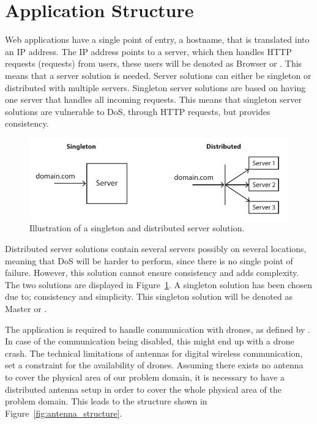 \section{Application Structure}
\label{sec:application_structure}

Web applications have a single point of entry, a hostname, that is translated into an IP address.
The IP address points to a server, which then handles HTTP requests (requests) from users, these users will be denoted as Browser or .
This means that a server solution is needed.
Server solutions can either be singleton or distributed with multiple servers.
Singleton server solutions are based on having one server that handles all incoming requests.
This means that singleton server solutions are vulnerable to DoS, through HTTP requests, but provides consistency.

\begin{figure}[htb]
    \centering
    \includegraphics[width=\textwidth]{gfx/server_solutions.pdf}
    \caption{Illustration of a singleton and distributed server solution.}
    \label{fig:server_solutions}
\end{figure}

Distributed server solutions contain several servers possibly on several locations, meaning that DoS will be harder to perform, since there is no single point of failure.
However, this solution cannot ensure consistency and adds complexity.
The two solutions are displayed in Figure~\ref{fig:server_solutions}.
A singleton solution has been chosen due to; consistency and simplicity.
This singleton solution will be denoted as Master or .

The application is required to handle communication with drones, as defined by .
In case of the communication being disabled, this might end up with a drone crash.
The technical limitations of antennas for digital wireless communication, set a constraint for the availability of drones.
Assuming there exists no antenna to cover the physical area of our problem domain, it is necessary to have a distributed antenna setup in order to cover the whole physical area of the problem domain.
This leads to the structure shown in Figure~\ref{fig:antenna_structure}.


